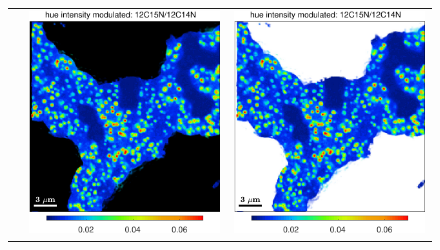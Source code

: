 \begin{figure}[!ht]
\begin{tabular}{ccc}
&
\includegraphics[scale=0.4, valign=t]{figs6/12C15N-12C14Nb}
&
\includegraphics[scale=0.4, valign=t]{figs6/12C15N-12C14Nc}

\end{tabular}
\end{figure}
